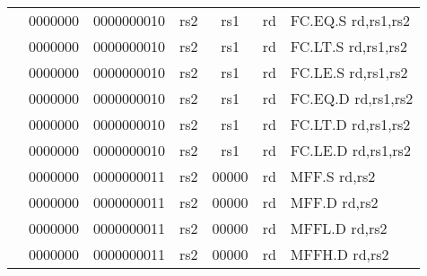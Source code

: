 \begin{table}[p]
\begin{small}
\begin{center}
\begin{tabular}{rcccccccccl}
&
\multicolumn{1}{|c|}{0000000} &
\multicolumn{5}{c|}{0000000010} &
\multicolumn{1}{c|}{rs2} &
\multicolumn{1}{c|}{rs1} &
\multicolumn{1}{c|}{rd} & FC.EQ.S rd,rs1,rs2 \\
\cline{2-10}
  

&
\multicolumn{1}{|c|}{0000000} &
\multicolumn{5}{c|}{0000000010} &
\multicolumn{1}{c|}{rs2} &
\multicolumn{1}{c|}{rs1} &
\multicolumn{1}{c|}{rd} & FC.LT.S rd,rs1,rs2 \\
\cline{2-10}
  

&
\multicolumn{1}{|c|}{0000000} &
\multicolumn{5}{c|}{0000000010} &
\multicolumn{1}{c|}{rs2} &
\multicolumn{1}{c|}{rs1} &
\multicolumn{1}{c|}{rd} & FC.LE.S rd,rs1,rs2 \\
\cline{2-10}
  

&
\multicolumn{1}{|c|}{0000000} &
\multicolumn{5}{c|}{0000000010} &
\multicolumn{1}{c|}{rs2} &
\multicolumn{1}{c|}{rs1} &
\multicolumn{1}{c|}{rd} & FC.EQ.D rd,rs1,rs2 \\
\cline{2-10}
  

&
\multicolumn{1}{|c|}{0000000} &
\multicolumn{5}{c|}{0000000010} &
\multicolumn{1}{c|}{rs2} &
\multicolumn{1}{c|}{rs1} &
\multicolumn{1}{c|}{rd} & FC.LT.D rd,rs1,rs2 \\
\cline{2-10}
  

&
\multicolumn{1}{|c|}{0000000} &
\multicolumn{5}{c|}{0000000010} &
\multicolumn{1}{c|}{rs2} &
\multicolumn{1}{c|}{rs1} &
\multicolumn{1}{c|}{rd} & FC.LE.D rd,rs1,rs2 \\
\cline{2-10}
  

&
\multicolumn{1}{|c|}{0000000} &
\multicolumn{5}{c|}{0000000011} &
\multicolumn{1}{c|}{rs2} &
\multicolumn{1}{c|}{00000} &
\multicolumn{1}{c|}{rd} & MFF.S rd,rs2 \\
\cline{2-10}
  

&
\multicolumn{1}{|c|}{0000000} &
\multicolumn{5}{c|}{0000000011} &
\multicolumn{1}{c|}{rs2} &
\multicolumn{1}{c|}{00000} &
\multicolumn{1}{c|}{rd} & MFF.D rd,rs2 \\
\cline{2-10}
  

&
\multicolumn{1}{|c|}{0000000} &
\multicolumn{5}{c|}{0000000011} &
\multicolumn{1}{c|}{rs2} &
\multicolumn{1}{c|}{00000} &
\multicolumn{1}{c|}{rd} & MFFL.D rd,rs2 \\
\cline{2-10}
  

&
\multicolumn{1}{|c|}{0000000} &
\multicolumn{5}{c|}{0000000011} &
\multicolumn{1}{c|}{rs2} &
\multicolumn{1}{c|}{00000} &
\multicolumn{1}{c|}{rd} & MFFH.D rd,rs2 \\
\cline{2-10}
  


\end{tabular}
\end{center}
\end{small}
\end{table}
